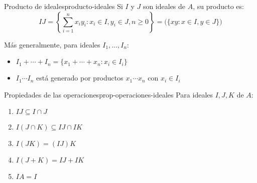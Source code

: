 \begin{definition}{Producto de ideales}{producto-ideales}
    Si \(I\) y \(J\) son ideales de \(A\), su {producto} es:
    \[
    IJ = \left\{\sum_{i=1}^n x_i y_i : x_i \in I, y_i \in J, n \geq 0\right\} = \Big(\{xy : x \in I, y \in J\}\Big)
    \]
\end{definition}

\begin{remark}
    Más generalmente, para ideales \(I_1, \ldots, I_n\):
    \begin{itemize}
        \item \(I_1 + \cdots + I_n = \{x_1 + \cdots + x_n : x_i \in I_i\}\)
        \item \(I_1 \cdots I_n\) está generado por productos \(x_1 \cdots x_n\) con \(x_i \in I_i\)
    \end{itemize}
\end{remark}

\begin{proposition}{Propiedades de las operaciones}{prop-operaciones-ideales}
    Para ideales \(I, J, K\) de \(A\):
    \begin{enumerate}
        \item \(IJ \subseteq I \cap J\)
        \item \(I(J \cap K) \subseteq IJ \cap IK\)
        \item \(I(JK) = (IJ)K\)
        \item \(I(J + K) = IJ + IK\)
        \item \(IA = I\)
    \end{enumerate}
\end{proposition}

